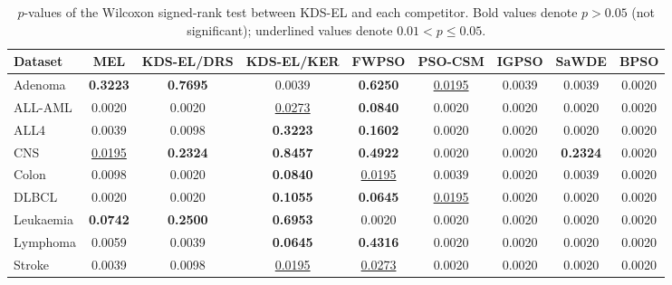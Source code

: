 \begin{table}[t]
\centering
\caption{$p$-values of the Wilcoxon signed-rank test between KDS-EL and each competitor.
Bold values denote $p>0.05$ (not significant); underlined values denote $0.01<p\leq0.05$.}
\label{tab:wilcoxon}
\setlength{\tabcolsep}{4pt}
\begin{tabular}{lcccccccc}
\toprule
\textbf{Dataset} & \textbf{MEL} & \textbf{KDS-EL/DRS} & \textbf{KDS-EL/KER} & \textbf{FWPSO} & \textbf{PSO-CSM} & \textbf{IGPSO} & \textbf{SaWDE} & \textbf{BPSO} \\
\midrule
Adenoma & \textbf{0.3223} & \textbf{0.7695} & 0.0039 & \textbf{0.6250} & \underline{0.0195} & 0.0039 & 0.0039 & 0.0020 \\
ALL-AML & 0.0020 & 0.0020 & \underline{0.0273} & \textbf{0.0840} & 0.0020 & 0.0020 & 0.0020 & 0.0020 \\
ALL4 & 0.0039 & 0.0098 & \textbf{0.3223} & \textbf{0.1602} & 0.0020 & 0.0020 & 0.0020 & 0.0020 \\
CNS & \underline{0.0195} & \textbf{0.2324} & \textbf{0.8457} & \textbf{0.4922} & 0.0020 & 0.0020 & \textbf{0.2324} & 0.0020 \\
Colon & 0.0098 & 0.0020 & \textbf{0.0840} & \underline{0.0195} & 0.0039 & 0.0020 & 0.0039 & 0.0020 \\
DLBCL & 0.0020 & 0.0020 & \textbf{0.1055} & \textbf{0.0645} & \underline{0.0195} & 0.0020 & 0.0020 & 0.0020 \\
Leukaemia & \textbf{0.0742} & \textbf{0.2500} & \textbf{0.6953} & 0.0020 & 0.0020 & 0.0020 & 0.0020 & 0.0020 \\
Lymphoma & 0.0059 & 0.0039 & \textbf{0.0645} & \textbf{0.4316} & 0.0020 & 0.0020 & 0.0020 & 0.0020 \\
Stroke & 0.0039 & 0.0098 & \underline{0.0195} & \underline{0.0273} & 0.0020 & 0.0020 & 0.0020 & 0.0020 \\
\bottomrule
\end{tabular}
\end{table}

